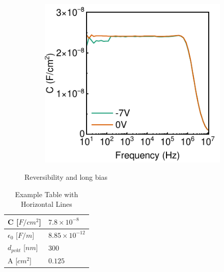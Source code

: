 \begin{figure}[htbp]
\begin{subfigure}[t]{0.4\textwidth}
        \includegraphics[width=\textwidth]{chapters/transport_layers/images/MOS_IS.pdf} %
        \caption{}
        \label{}
    \end{subfigure}

    \caption{Reversibility and long bias}
    \label{}
\end{figure}


\begin{table}[htbp]
    \centering
    \renewcommand{\arraystretch}{1.5} %
    \begin{tabular}{@{} l l @{}}
        \hline
        C [$F/cm^2$] & $7.8\times10^{-8}$\\ \hline
        $\epsilon_0$ [$F/m$]& $8.85\times10^{-12}$ \\ \hline
        $d_{pvkt}$ [$nm$] & $300$ \\ \hline
        A [$cm^2$] & $0.125$ \\ \hline
    \end{tabular}
    \caption{Example Table with Horizontal Lines} %
    \label{tab:etl_opt:er_from_pepd} %
\end{table}

